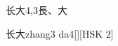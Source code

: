 \begin{entry}{长大}{4,3}{⾧、⼤}
  \begin{phonetics}{长大}{zhang3 da4}[][HSK 2]
  \end{phonetics}
\end{entry}
